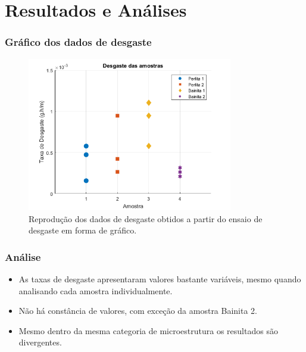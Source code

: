 \documentclass{beamer}
\begin{document}





\section{Resultados e Análises}

\begin{frame}
\frametitle{Gráfico dos dados de desgaste}
\begin{figure}
	\centering
	\includegraphics[width=0.8\textwidth]{graf1}
	\caption{Reprodução dos dados de desgaste obtidos a partir do ensaio de desgaste em forma de gráfico.}
	\label{fig:graf1}
\end{figure}
\end{frame}

\begin{frame}
\frametitle{Análise}
\begin{itemize}
	\item As taxas de desgaste apresentaram valores bastante variáveis, mesmo quando analisando cada amostra individualmente.
	\item Não há constância de valores, com exceção da amostra Bainita 2. 
	\item Mesmo dentro da mesma categoria de microestrutura os resultados são divergentes.
\end{itemize}

\end{frame}
\end{document}
